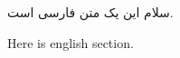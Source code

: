 \documentclass{article}
\begin{document}
سلام این یک متن فارسی است.

\begin{latin}
  Here is english section.
  \cite{greenwade93}
\end{latin}

\setLTRbibitems
\makeatletter
{}
\makeatother


\end{document}
